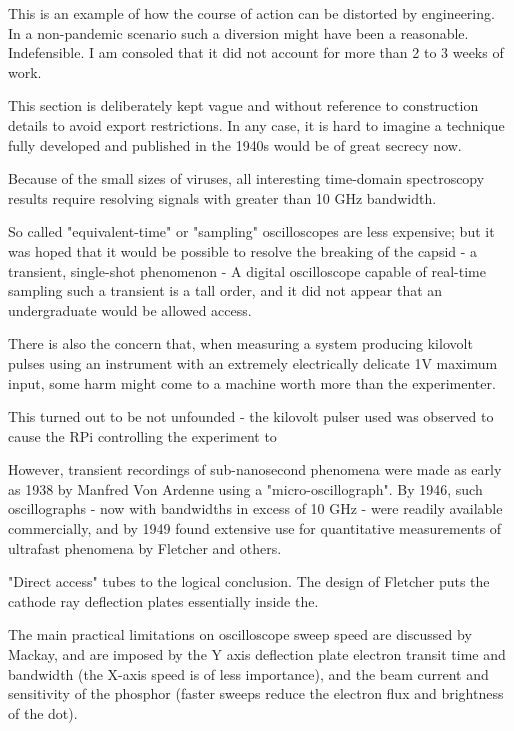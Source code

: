 \documentclass[paper.tex]{subfiles}
\begin{document}
\begin{autem}
This is an example of how the course of action can be distorted by engineering. In a non-pandemic scenario such a diversion might have been a reasonable. Indefensible. I am consoled that it did not account for more than 2 to 3 weeks of work.
\end{autem}


\begin{autem}
	This section is deliberately kept vague and without reference to construction details to avoid export restrictions. In any case, it is hard to imagine a technique fully developed and published in the 1940s would be of great secrecy now. 
\end{autem}

Because of the small sizes of viruses, all interesting time-domain spectroscopy results require resolving signals with greater than 10 GHz bandwidth.

So called "equivalent-time" or "sampling" oscilloscopes are less expensive; but it was hoped that it would be possible to resolve the breaking of the capsid - a transient, single-shot phenomenon -   A digital oscilloscope capable of real-time sampling such a transient is a tall order, and it did not appear that an undergraduate would be allowed access.

There is also the concern that, when measuring a system producing kilovolt pulses using an instrument with an extremely electrically delicate 1V maximum input, some harm might come to a machine worth more than the experimenter. 

This turned out to be not unfounded - the kilovolt pulser used was observed to cause the RPi controlling the experiment to 

However, transient recordings of sub-nanosecond phenomena were made as early as 1938 by Manfred Von Ardenne using a "micro-oscillograph". By 1946, such oscillographs - now with bandwidths in excess of 10 GHz - were readily available commercially\cite{3beam1946}, and by 1949 found extensive use for quantitative measurements of ultrafast phenomena by Fletcher\cite{Production1949} and others. 

"Direct access" tubes to the logical conclusion. The design of Fletcher puts the cathode ray deflection plates essentially inside the.

The main practical limitations on oscilloscope sweep speed are discussed by Mackay\cite{New1948}, and are imposed by the Y axis deflection plate electron transit time and bandwidth (the X-axis speed is of less importance), and the beam current and sensitivity of the phosphor (faster sweeps reduce the electron flux and brightness of the dot).
\end{document}
